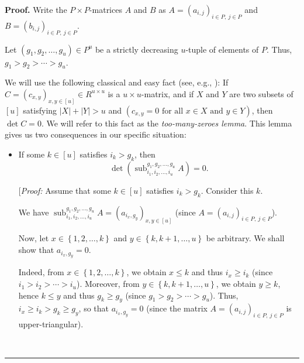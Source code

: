 \documentclass[numbers=enddot,12pt,final,onecolumn,notitlepage]{scrartcl}%
\numberwithin{exer}{section}
\theoremstyle{definition}
\newenvironment{proof}[1][Proof]{\noindent\textbf{#1.} }{\ \rule{0.5em}{0.5em}}
\theoremstyle{plainsl}
\begin{document}
\begin{proof}
Write the $P\times P$-matrices $A$ and $B$ as $A=\left(  a_{i,j}\right)
_{i\in P,\ j\in P}$ and $B=\left(  b_{i,j}\right)  _{i\in P,\ j\in P}$.

Let $\left(  g_{1},g_{2},\ldots,g_{u}\right)  \in P^{u}$ be a strictly
decreasing $u$-tuple of elements of $P$. Thus, $g_{1}>g_{2}>\cdots>g_{u}$.

We will use the following classical and easy fact (see, e.g., \cite[Exercise
6.47 \textbf{(a)}]{detnotes}): If $C=\left(  c_{x,y}\right)  _{x,y\in\left[
u\right]  }\in R^{u\times u}$ is a $u\times u$-matrix, and if $X$ and $Y$ are
two subsets of $\left[  u\right]  $ satisfying $\left\vert X\right\vert
+\left\vert Y\right\vert >u$ and $\left(  c_{x,y}=0\text{ for all }x\in
X\text{ and }y\in Y\right)  $, then $\det C=0$. We will refer to this fact as
the \emph{too-many-zeroes lemma}. This lemma gives us two consequences in our
specific situation:

\begin{itemize}
\item If some $k\in\left[  u\right]  $ satisfies $i_{k}>g_{k}$, then
\begin{equation}
\det\left(  \operatorname*{sub}\nolimits_{i_{1},i_{2},\ldots,i_{u}}%
^{g_{1},g_{2},\ldots,g_{u}}A\right)  =0.
\label{pf.lem.Stilde.coproduct.CB4.pf.3}%
\end{equation}


[\textit{Proof:} Assume that some $k\in\left[  u\right]  $ satisfies
$i_{k}>g_{k}$. Consider this $k$.

We have $\operatorname*{sub}\nolimits_{i_{1},i_{2},\ldots,i_{u}}^{g_{1}%
,g_{2},\ldots,g_{u}}A=\left(  a_{i_{x},g_{y}}\right)  _{x,y\in\left[
u\right]  }$ (since $A=\left(  a_{i,j}\right)  _{i\in P,\ j\in P}$).

Now, let $x\in\left\{  1,2,\ldots,k\right\}  $ and $y\in\left\{
k,k+1,\ldots,u\right\}  $ be arbitrary. We shall show that $a_{i_{x},g_{y}}=0$.

Indeed, from $x\in\left\{  1,2,\ldots,k\right\}  $, we obtain $x\leq k$ and
thus $i_{x}\geq i_{k}$ (since $i_{1}>i_{2}>\cdots>i_{u}$). Moreover, from
$y\in\left\{  k,k+1,\ldots,u\right\}  $, we obtain $y\geq k$, hence $k\leq y$
and thus $g_{k}\geq g_{y}$ (since $g_{1}>g_{2}>\cdots>g_{u}$). Thus,
$i_{x}\geq i_{k}>g_{k}\geq g_{y}$, so that $a_{i_{x},g_{y}}=0$ (since the
matrix $A=\left(  a_{i,j}\right)  _{i\in P,\ j\in P}$ is upper-triangular).


\end{itemize}
\end{proof}
\end{document}
